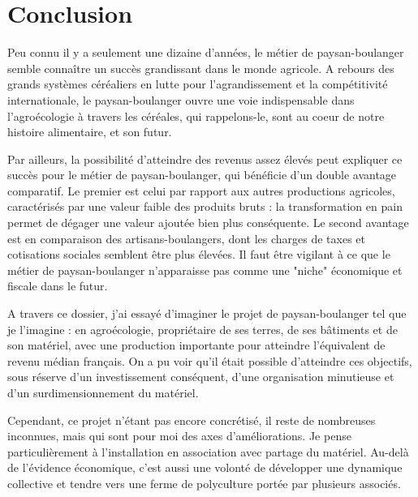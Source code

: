 \documentclass{book}
\begin{document}
\chapter*{Conclusion}


Peu connu il y a seulement une dizaine d'années, le métier de paysan-boulanger semble connaître un succès grandissant dans le monde agricole. A rebours des grands systèmes céréaliers en lutte pour l'agrandissement et la compétitivité internationale, le paysan-boulanger ouvre une voie indispensable dans l'agroécologie à travers les céréales, qui rappelons-le, sont au coeur de notre histoire alimentaire, et son futur. 

Par ailleurs, la possibilité d'atteindre des revenus assez élevés peut expliquer ce succès pour le métier de paysan-boulanger, qui bénéficie d'un double avantage comparatif. Le premier est celui par rapport aux autres productions agricoles, caractérisés par une valeur faible des produits bruts : la transformation en pain permet de dégager une valeur ajoutée bien plus conséquente. Le second avantage est en comparaison des artisans-boulangers, dont les charges de taxes et cotisations sociales semblent être plus élevées. Il faut être vigilant à ce que le métier de paysan-boulanger n'apparaisse pas comme une "niche" économique et fiscale dans le futur.

A travers ce dossier, j'ai essayé d'imaginer le projet de paysan-boulanger tel que je l'imagine : en agroécologie, propriétaire de ses terres, de ses bâtiments et de son matériel, avec une production importante pour atteindre l'équivalent de revenu médian français. On a pu voir qu'il était possible d'atteindre ces objectifs, sous réserve d'un investissement conséquent, d'une organisation minutieuse et d'un surdimensionnement du matériel.

Cependant, ce projet n'étant pas encore concrétisé, il reste de nombreuses inconnues, mais qui sont pour moi des axes d'améliorations. Je pense particulièrement à l'installation en association avec partage du matériel. Au-delà de l'évidence économique, c'est aussi une volonté de développer une dynamique collective et tendre vers une ferme de polyculture portée par plusieurs associés. 
\end{document}

